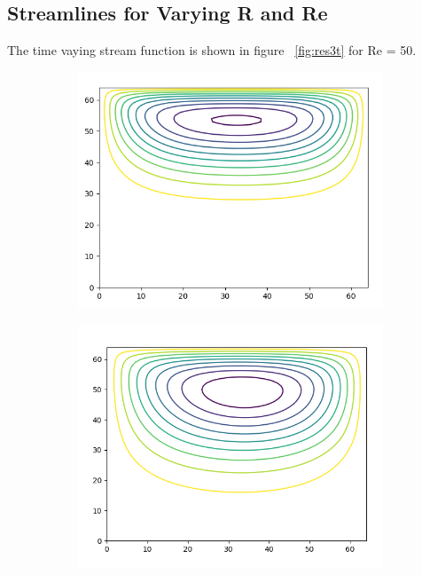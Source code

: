 \documentclass{article}
\begin{document}
\subsection{Streamlines for Varying R and Re}
The time vaying stream function is shown in figure ~\ref{fig:res3t} for Re = 50.
\begin{figure}
  \begin{subfigure}[b]{0.5\textwidth}
    \includegraphics[width=\textwidth]{t1.png}
  \end{subfigure}
  \begin{subfigure}[b]{0.5\textwidth}
    \includegraphics[width=\textwidth]{t2.png}
  \end{subfigure}

\end{figure}
\end{document}
